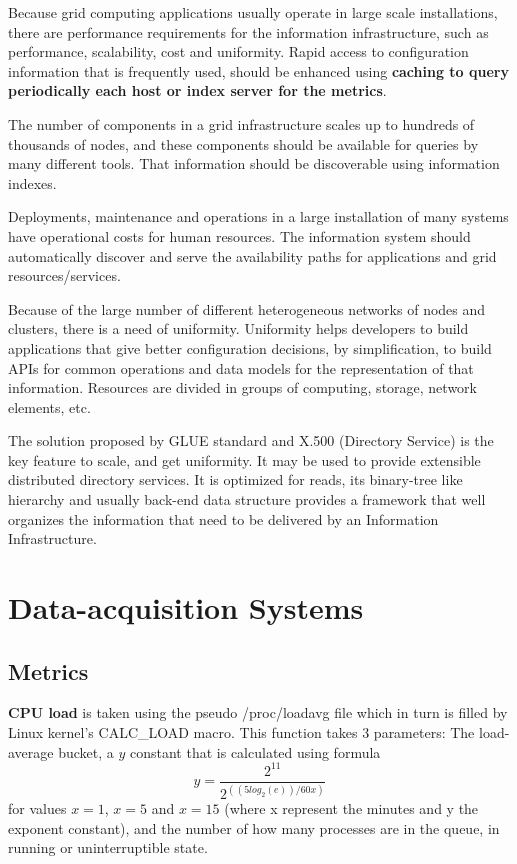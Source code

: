 Because grid computing applications usually operate in large scale installations, there are performance requirements for the information infrastructure, such as performance, scalability, cost and uniformity. Rapid access to configuration information that is frequently used, should be enhanced using {\bf caching to query periodically each host or index server for the metrics}.

The number of components in a grid infrastructure scales up to hundreds of thousands of nodes, and these components should be available for queries by many different tools. That information should be discoverable using information indexes.

Deployments, maintenance and operations in a large installation of many systems have operational costs for human resources. The information system should automatically discover and serve the availability paths for applications and grid resources/services.

Because of the large number of different heterogeneous networks of nodes and clusters, there is a need of uniformity. Uniformity helps developers to build applications that give better configuration decisions, by simplification, to build APIs for common operations and data models for the representation of that information. Resources are divided in groups of computing, storage, network elements, etc.

The solution proposed by \ac{GLUE} standard and X.500 (Directory Service) is the key feature to scale, and get uniformity. It may be used to provide extensible distributed directory services. It is optimized for reads, its binary-tree like hierarchy and usually back-end data structure provides a framework that well organizes the information that need to be delivered by an Information Infrastructure.\cite{mds1}

\section{Data-acquisition Systems}

\subsection{Metrics}\label{subsec:metrics}

{\bf CPU load} is taken using the pseudo /proc/loadavg file which in turn is
filled by Linux kernel's CALC\_LOAD macro. This function takes 3 parameters:
The load-average bucket, a $y$ constant that is calculated using formula
\[
y=\frac{2^{11}}{2^{((5log_2(e))/60x)}}
\]
for values $x=1$, $x=5$ and $x=15$ (where x represent the minutes and y the
exponent constant), and the number of how many processes are in the queue, in
running or uninterruptible state.

